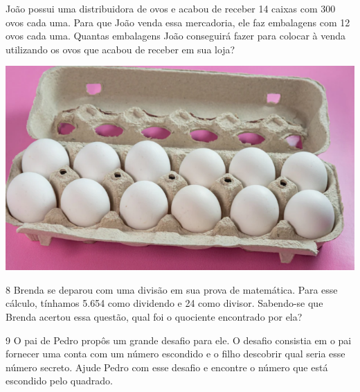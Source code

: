 \begin{minipage}{.5\textwidth}
João possui uma distribuidora de ovos e acabou de receber 14 caixas
com 300 ovos cada uma. Para que João venda essa mercadoria, ele faz
embalagens com 12 ovos cada uma. Quantas embalagens João conseguirá
fazer para colocar à venda utilizando os ovos que acabou de receber em
sua loja?
\end{minipage}\hspace*{.5cm}
\begin{minipage}{.5\textwidth}
\includegraphics[width=\textwidth]{./imgs/mat3.png}
\end{minipage}


\bigskip
\bigskip
\bigskip
\bigskip
\bigskip

\num{8} Brenda se deparou com uma divisão em sua prova de matemática. Para
esse cálculo, tínhamos 5.654 como dividendo e 24 como divisor. Sabendo-se
que Brenda acertou essa questão, qual foi o quociente encontrado por ela?


\pagebreak

\num{9} O pai de Pedro propôs um grande desafio para ele. O desafio
consistia em o pai fornecer uma conta com um número escondido e o filho descobrir qual seria esse número secreto. Ajude Pedro com esse
desafio e encontre o número que está escondido pelo quadrado.

